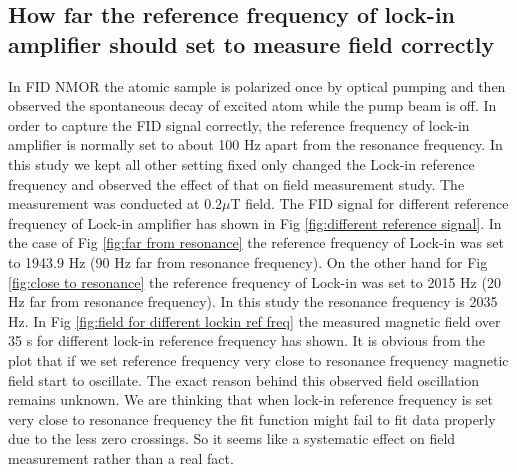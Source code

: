 \subsection{How far the reference frequency of lock-in amplifier should set to measure field correctly}
  
  In FID NMOR the atomic sample is polarized once by optical pumping and then observed the spontaneous decay of excited atom while the pump beam is off. In order to capture the FID signal correctly, the reference frequency of lock-in amplifier is normally set to about 100 Hz apart from the resonance frequency. In this study we kept all other setting fixed only changed the Lock-in reference frequency and observed the effect of that on field measurement study. The measurement was conducted at $0.2 \mu$T field. The FID signal for different reference frequency of Lock-in amplifier has shown in Fig \ref{fig:different reference signal}. In the case of Fig \ref{fig:far from resonance} the reference frequency of Lock-in was set to 1943.9 Hz (90 Hz far from resonance frequency). On the other hand for Fig \ref{fig:close to resonance} the reference frequency of Lock-in was set to 2015 Hz (20 Hz far from resonance frequency). In this study the resonance frequency is 2035 Hz. In Fig \ref{fig:field for different lockin ref freq} the measured magnetic field over 35 s for different lock-in reference frequency has shown. It is obvious from the plot that if we set reference frequency very close to resonance frequency magnetic field start to oscillate. The exact reason behind this observed field oscillation remains unknown. We are thinking that when lock-in reference frequency is set very close to resonance frequency the fit function might fail to fit data properly due to the less zero crossings. So it seems like a systematic effect on field measurement rather than a real fact.

